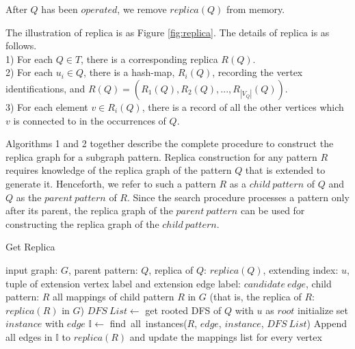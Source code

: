 \newline
\newline
After $Q$ has been $operated$, we remove $replica(Q)$ from memory.

 The illustration of replica is as Figure \ref{fig:replica}. The details of replica is as follows.\\1) For each $Q\in T$, there is a corresponding replica $R(Q)$.\\2) For each $u_i\in Q$, there is a hash-map, $R_i(Q)$, recording the vertex identifications, and $R(Q)=(R_1(Q), R_2(Q), ..., R_{|V_Q|}(Q))$.\\3) For each element $v\in R_i(Q)$, there is a record of all the other vertices which $v$ is connected to in the occurrences of $Q$.

Algorithms 1 and 2 together describe the complete procedure to construct the replica graph for a subgraph pattern. Replica construction for any pattern $R$ requires knowledge of the replica graph of the pattern $Q$ that is extended to generate it. Henceforth, we refer to such a pattern $R$ as a $child\ pattern$ of $Q$ and $Q$ as the $parent\ pattern$ of $R$. Since the search procedure processes a pattern only after its parent, the replica graph of the $parent\ pattern$ can be used for constructing the replica graph of the $child\ pattern$.  

    \begin{algorithm}
	\caption{Get Replica}\label{algo:search}
	\begin{algorithmic}[1] 
	\REQUIRE input graph: $G$, parent pattern: $Q$, replica of $Q$: $replica(Q)$, extending index: $u$, tuple of extension vertex label and extension edge label: $candidate\ edge$, child pattern: $R$
	\ENSURE all mappings of child pattern $R$ in $G$ (that is, the replica of $R$: $replica(R)$ in $G$)
	\STATE $DFS\ List\leftarrow$ get rooted {\sf DFS} of $Q$ with $u$ as $root$
    \STATE initialize set $instance$ with $edge$
	\STATE $\mathbb{I}\leftarrow$ {\sf find\ all\ instances($R$, $edge$, $instance$, $DFS\ List$)}
    \STATE Append all edges in $\mathbb{I}$ to $replica(R)$ and update the mappings list for every vertex
	\ENDFOR
	\ENDFOR
	\end{algorithmic}
	\end{algorithm}

